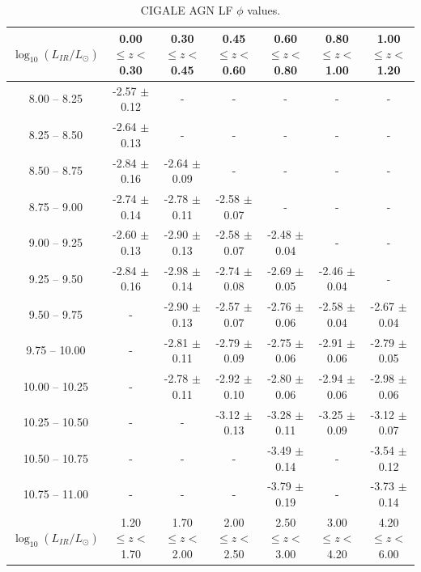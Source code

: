 \begin{table}
    \begin{center}
    \caption{CIGALE AGN LF $\phi$ values.}
    \label{Tab: CG AGN LF}
    \begin{tabular}{@{}ccccccc@{}}
        \toprule
        $\log_{10}(L_{IR}/L_{\odot})$ & 0.00 $\leq z <$ 0.30 & 0.30 $\leq z <$ 0.45 & 0.45 $\leq z <$ 0.60 & 0.60 $\leq z <$ 0.80 & 0.80 $\leq z <$ 1.00 & 1.00 $\leq z <$ 1.20 \\
        \hline
         8.00 --  8.25 & -2.57 $\pm$ 0.12 & -                & -                & -                & -                & - \\
         8.25 --  8.50 & -2.64 $\pm$ 0.13 & -                & -                & -                & -                & - \\
         8.50 --  8.75 & -2.84 $\pm$ 0.16 & -2.64 $\pm$ 0.09 & -                & -                & -                & - \\
         8.75 --  9.00 & -2.74 $\pm$ 0.14 & -2.78 $\pm$ 0.11 & -2.58 $\pm$ 0.07 & -                & -                & - \\
         9.00 --  9.25 & -2.60 $\pm$ 0.13 & -2.90 $\pm$ 0.13 & -2.58 $\pm$ 0.07 & -2.48 $\pm$ 0.04 & -                & - \\
         9.25 --  9.50 & -2.84 $\pm$ 0.16 & -2.98 $\pm$ 0.14 & -2.74 $\pm$ 0.08 & -2.69 $\pm$ 0.05 & -2.46 $\pm$ 0.04 & - \\
         9.50 --  9.75 & -                & -2.90 $\pm$ 0.13 & -2.57 $\pm$ 0.07 & -2.76 $\pm$ 0.06 & -2.58 $\pm$ 0.04 & -2.67 $\pm$ 0.04 \\
         9.75 -- 10.00 & -                & -2.81 $\pm$ 0.11 & -2.79 $\pm$ 0.09 & -2.75 $\pm$ 0.06 & -2.91 $\pm$ 0.06 & -2.79 $\pm$ 0.05 \\
        10.00 -- 10.25 & -                & -2.78 $\pm$ 0.11 & -2.92 $\pm$ 0.10 & -2.80 $\pm$ 0.06 & -2.94 $\pm$ 0.06 & -2.98 $\pm$ 0.06 \\
        10.25 -- 10.50 & -                & -                & -3.12 $\pm$ 0.13 & -3.28 $\pm$ 0.11 & -3.25 $\pm$ 0.09 & -3.12 $\pm$ 0.07 \\
        10.50 -- 10.75 & -                & -                & -                & -3.49 $\pm$ 0.14 & -                & -3.54 $\pm$ 0.12 \\
        10.75 -- 11.00 & -                & -                & -                & -3.79 $\pm$ 0.19 & -                & -3.73 $\pm$ 0.14 \\
        \hline
        $\log_{10}(L_{IR}/L_{\odot})$ & 1.20 $\leq z <$ 1.70 & 1.70 $\leq z <$ 2.00 & 2.00 $\leq z <$ 2.50 & 2.50 $\leq z <$ 3.00 & 3.00 $\leq z <$ 4.20 & 4.20 $\leq z <$ 6.00  \\

\end{tabular}
\end{center}
\end{table}
